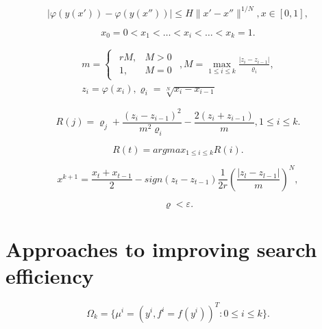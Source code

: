 \documentclass[runningheads]{llncs}
\begin{document}
\begin{equation}
\label{eq:08}
|\varphi(y(x')) - \varphi(y(x''))| \leq H \|x' - x''\|^{1/N} , x \in [0,1],
\end{equation}


\begin{equation}
    \label{eq:09}
    x_0 = 0 < x_1 < \dots < x_i < \dots < x_{k} = 1.
\end{equation}


\begin{equation}
    \label{eq:10}
		\begin{matrix}
		m=\begin{cases}
				\begin{matrix}
					 r M, & M >0 \\
					 1, & M = 0 
				\end{matrix} 
			\end{cases} ,
		M = \max_{1 \leq i \leq k} \frac{| z_i - z_{i-1}|}{\varrho_i}, \\
		z_i = \varphi( x_i ), \varrho_i=\sqrt[N]{x_i-x_{i-1}}
		\end{matrix}
\end{equation}

\begin{equation}
    \label{eq:11}
    R(j) = \varrho_j + \frac{(z_i-z_{i-1})^2}{m^2 \varrho_i} - \frac{2 (z_i+z_{i-1})}{m}, 1 \leq i \leq k.
\end{equation}


\begin{equation}
    \label{eq:12}
    R(t) = argmax_{1 \leq i \leq k} {R(i)}.
\end{equation}


\begin{equation}
    \label{eq:13}
    x^{k+1} = \frac{x_t + x_{t-1}}{2} - sign(z_t - z_{t-1}) \frac{1}{2r} \left(\frac{|z_l - z_{l-1}|}{m} \right)^N,
\end{equation}


\begin{equation}
    \label{eq:14}
    \varrho < \varepsilon.
\end{equation}



\section{Approaches to improving search efficiency}
\label{sec:4}

\begin{equation}
    \label{eq:15}
    \Omega_k=\{\mu^i = (y^i,f^i=f(y^i))^T: 0 \leq i \leq k\}.
\end{equation}
\end{document}
